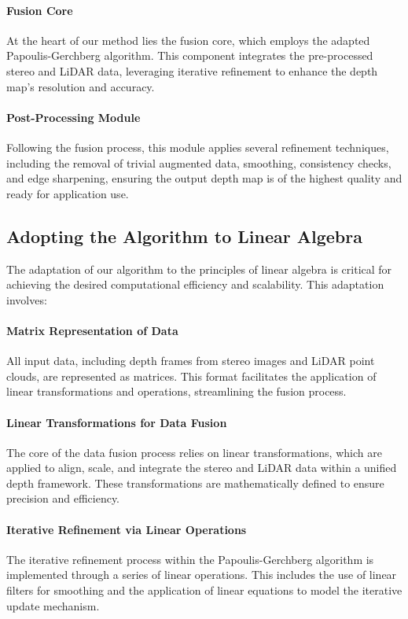\documentclass[conference]{IEEEtran}
\begin{document}
\paragraph{Fusion Core}
At the heart of our method lies the fusion core, which employs the adapted Papoulis-Gerchberg algorithm. This component integrates the pre-processed stereo and LiDAR data, leveraging iterative refinement to enhance the depth map's resolution and accuracy.

\paragraph{Post-Processing Module}
Following the fusion process, this module applies several refinement techniques, including the removal of trivial augmented data, smoothing, consistency checks, and edge sharpening, ensuring the output depth map is of the highest quality and ready for application use.

\subsection{Adopting the Algorithm to Linear Algebra}

The adaptation of our algorithm to the principles of linear algebra is critical for achieving the desired computational efficiency and scalability. This adaptation involves:

\paragraph{Matrix Representation of Data} 
All input data, including depth frames from stereo images and LiDAR point clouds, are represented as matrices. This format facilitates the application of linear transformations and operations, streamlining the fusion process.

\paragraph{Linear Transformations for Data Fusion}
The core of the data fusion process relies on linear transformations, which are applied to align, scale, and integrate the stereo and LiDAR data within a unified depth framework. These transformations are mathematically defined to ensure precision and efficiency.

\paragraph{Iterative Refinement via Linear Operations} 
The iterative refinement process within the Papoulis-Gerchberg algorithm is implemented through a series of linear operations. This includes the use of linear filters for smoothing and the application of linear equations to model the iterative update mechanism.
\end{document}
